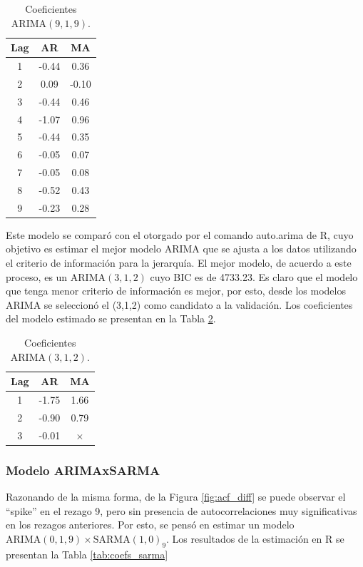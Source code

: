 \documentclass[conference]{IEEEtran}
\begin{document}
\begin{table}[H]
\centering
\caption{Coeficientes $\mathrm{ARIMA}(9,1,9)$.}
\label{tab:coefs_ar9}
\begin{tabular}{ccc}
\hline
\textbf{Lag} & \textbf{AR} & \textbf{MA} \\ \hline
1 & -0.44 & 0.36 \\
2 & 0.09 & -0.10 \\
3 & -0.44 & 0.46 \\
4 & -1.07 & 0.96 \\
5 & -0.44 & 0.35 \\
6 & -0.05 & 0.07 \\
7 & -0.05 & 0.08 \\
8 & -0.52 & 0.43 \\
9 & -0.23 & 0.28 \\ \hline
\end{tabular}
\end{table}

Este modelo se comparó con el otorgado por el comando auto.arima de R, cuyo objetivo es estimar el mejor modelo ARIMA que se ajusta a los datos utilizando el criterio de información para la jerarquía. El mejor modelo, de acuerdo a este proceso, es un $\mathrm{ARIMA}(3,1,2)$ cuyo BIC es de 4733.23. Es claro que el modelo que tenga menor criterio de información es mejor, por esto, desde los modelos ARIMA se seleccionó el (3,1,2) como candidato a la validación. Los coeficientes del modelo estimado se presentan en la Tabla \ref{tab:coefs_arima}.

\begin{table}[H]
\centering
\caption{Coeficientes $\mathrm{ARIMA}(3,1,2)$.}
\label{tab:coefs_arima}
\begin{tabular}{ccc}
\hline
\textbf{Lag} & \textbf{AR} & \textbf{MA} \\ \hline
1 & -1.75 & 1.66 \\
2 & -0.90 & 0.79 \\
3 & -0.01 & $\times$ \\\hline
\end{tabular}
\end{table}
\subsubsection{Modelo ARIMAxSARMA}
Razonando de la misma forma, de la Figura \ref{fig:acf_diff} se puede observar el ``spike'' en el rezago 9, pero sin presencia de autocorrelaciones muy significativas en los rezagos anteriores. Por esto, se pensó en estimar un modelo $\mathrm{ARIMA}(0,1,9)\times\mathrm{SARMA}(1,0)_9$. Los resultados de la estimación en R se presentan la Tabla \ref{tab:coefs_sarma}
\end{document}
